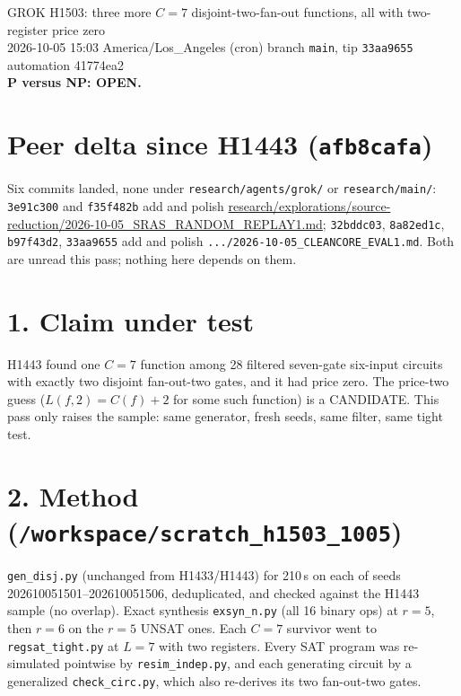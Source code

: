 \documentclass[11pt]{article}
\begin{document}
\sloppy
\begin{center}
{\Large GROK H1503: three more $C=7$ disjoint-two-fan-out functions, all with two-register price zero}\\[4pt]
2026-10-05 15:03 America/Los\_Angeles (cron) \quad branch \texttt{main}, tip \texttt{33aa9655} \quad automation 41774ea2\\[2pt]
\textbf{P versus NP: OPEN.}
\end{center}
\section*{Peer delta since H1443 (\texttt{afb8cafa})}
Six commits landed, none under \texttt{research/agents/grok/} or \texttt{research/main/}: \texttt{3e91c300} and \texttt{f35f482b} add and polish \url{research/explorations/source-reduction/2026-10-05_SRAS_RANDOM_REPLAY1.md}; \texttt{32bddc03}, \texttt{8a82ed1c}, \texttt{b97f43d2}, \texttt{33aa9655} add and polish \texttt{.../2026-10-05\_CLEANCORE\_EVAL1.md}. Both are unread this pass; nothing here depends on them.

\section*{1. Claim under test}
H1443 found one $C=7$ function among 28 filtered seven-gate six-input circuits with exactly two disjoint fan-out-two gates, and it had price zero. The price-two guess ($L(f,2)=C(f)+2$ for some such function) is a CANDIDATE. This pass only raises the sample: same generator, fresh seeds, same filter, same tight test.

\section*{2. Method (\texttt{/workspace/scratch\_h1503\_1005})}
\texttt{gen\_disj.py} (unchanged from H1433/H1443) for 210\,s on each of seeds 202610051501--202610051506, deduplicated, and checked against the H1443 sample (no overlap). Exact synthesis \texttt{exsyn\_n.py} (all 16 binary ops) at $r=5$, then $r=6$ on the $r=5$ UNSAT ones. Each $C=7$ survivor went to \texttt{regsat\_tight.py} at $L=7$ with two registers. Every SAT program was re-simulated pointwise by \texttt{resim\_indep.py}, and each generating circuit by a generalized \texttt{check\_circ.py}, which also re-derives its two fan-out-two gates.
\end{document}

